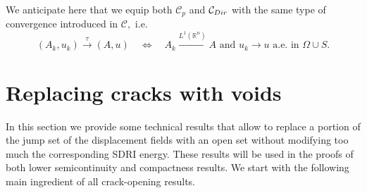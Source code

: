 \documentclass[reqno]{amsart}
\numberwithin{equation}{section}
\theoremstyle{plain}
\theoremstyle{definition}
\newcommand{\R}{\mathbb{R}}
\newcommand{\admissible}{\mathcal{C}}
\begin{document}
We anticipate here that we equip both $\admissible_p$ and $\admissible_{\rm Dir}$ with the same type of convergence introduced in $\admissible,$ i.e. 
\begin{equation}
(A_k,u_k) \overset{\tau}\to (A,u)\quad\Longleftrightarrow \quad A_k\overset{L^1(\R^n)}{\longrightarrow} A\,\, \text{and}\,\, u_k\to u\,\,\text{a.e.\  in $\Omega\cup S.$}
\label{tau_convergence_CACA}
\end{equation}

\section{Replacing cracks with voids}\label{sec:prelim_results}

In this section we provide some technical results that allow to replace a portion of the jump set of the displacement fields with an open set without modifying too much the corresponding SDRI energy. These results will be used in the proofs of both lower semicontinuity and compactness results. We start with the following main ingredient of all crack-opening results.
\end{document}
